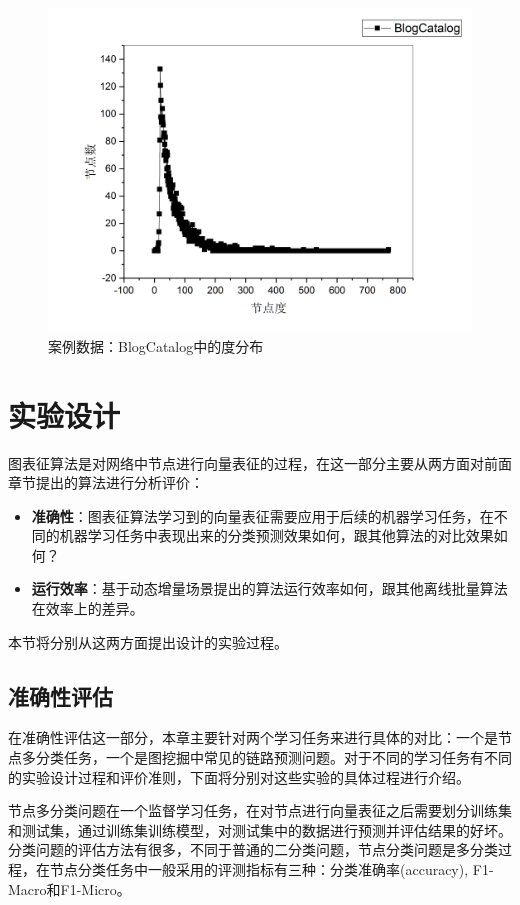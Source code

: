 \begin{figure}
	\centering
	\includegraphics[width=5in]{figures/blogCatalog_degree}
	\caption{案例数据：BlogCatalog中的度分布}
\end{figure}
\section{实验设计}
图表征算法是对网络中节点进行向量表征的过程，在这一部分主要从两方面对前面章节提出的算法进行分析评价：
\begin{itemize}
	\item \textbf{准确性}：图表征算法学习到的向量表征需要应用于后续的机器学习任务，在不同的机器学习任务中表现出来的分类预测效果如何，跟其他算法的对比效果如何？
	\item \textbf{运行效率}：基于动态增量场景提出的算法运行效率如何，跟其他离线批量算法在效率上的差异。
\end{itemize}
本节将分别从这两方面提出设计的实验过程。
\subsection{准确性评估}
在准确性评估这一部分，本章主要针对两个学习任务来进行具体的对比：一个是节点多分类任务，一个是图挖掘中常见的链路预测问题。对于不同的学习任务有不同的实验设计过程和评价准则，下面将分别对这些实验的具体过程进行介绍。

节点多分类问题在一个监督学习任务，在对节点进行向量表征之后需要划分训练集和测试集，通过训练集训练模型，对测试集中的数据进行预测并评估结果的好坏。分类问题的评估方法有很多，不同于普通的二分类问题，节点分类问题是多分类过程，在节点分类任务中一般采用的评测指标有三种：分类准确率(accuracy), F1-Macro和F1-Micro。

